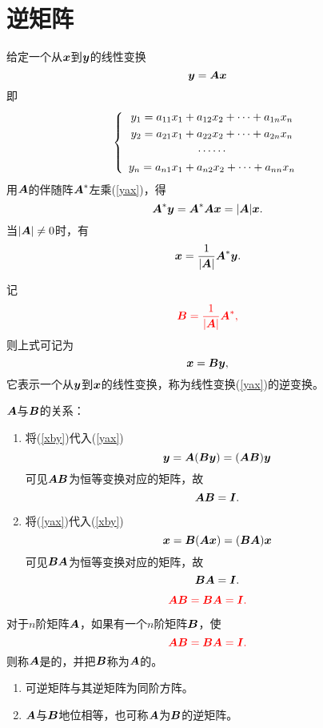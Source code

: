 \section{逆矩阵}
给定一个从$\vx$到$\vy$的线性变换
\begin{equation}\label{yax}
  \vy = \MA \vx  
\end{equation}       
即
$$
\left\{
  \begin{array}{c}
    y_1 = a_{11}x_1 + a_{12}x_2 + \cd + a_{1n}x_n\\[0.1cm]
    y_2 = a_{21}x_1 + a_{22}x_2 + \cd + a_{2n}x_n\\[0.1cm]
    \cd\cd \\[0.1cm]
    y_n = a_{n1}x_1 + a_{n2}x_2 + \cd + a_{nn}x_n
  \end{array}
\right.
$$
用$\MA$的伴随阵$\MA^*$左乘(\ref{yax})，得
$$
\MA^* \vy = \MA^* \MA \vx  = |\MA|\vx.
$$
当$|\MA|\ne 0$时，有
$$
\vx = \frac{1}{|\MA|}\MA^* \vy.
$$

记
$$
\red{\MB = \frac{1}{|\MA|}\MA^*,}
$$
则上式可记为
\begin{equation}\label{xby}
  \vx = \MB \vy,
\end{equation}
它表示一个从$\vy$到$\vx$的线性变换，称为线性变换(\ref{yax})的逆变换。


\begin{zhu}$\MA$与$\MB$的关系：
  \begin{enumerate}
  \item 将(\ref{xby})代入(\ref{yax})
    $$
    \vy = \MA(\MB\vy) = (\MA\MB)\vy
    $$
    可见$\MA\MB$为恒等变换对应的矩阵，故
    $$\MA\MB=\MI.$$    
  \item 将(\ref{yax})代入(\ref{xby})
    $$
    \vx = \MB(\MA\vx) = (\MB\MA)\vx
    $$
    可见$\MB\MA$为恒等变换对应的矩阵，故
    $$\MB\MA=\MI.$$
  \end{enumerate}
\end{zhu}

$$
\red{
  \MA\MB = \MB\MA = \MI.
}
$$

\begin{dingyi}[逆矩阵]
  对于$n$阶矩阵$\MA$，如果有一个$n$阶矩阵$\MB$，使
  $$
  \red{
    \MA\MB = \MB\MA = \MI.
  }
  $$
  则称$\MA$是的，并把$\MB$称为$\MA$的。
\end{dingyi}


\begin{zhu}
  \begin{enumerate}
  \item 可逆矩阵与其逆矩阵为同阶方阵。
  \item $\MA$与$\MB$地位相等，也可称$\MA$为$\MB$的逆矩阵。      
  \end{enumerate}
\end{zhu}


